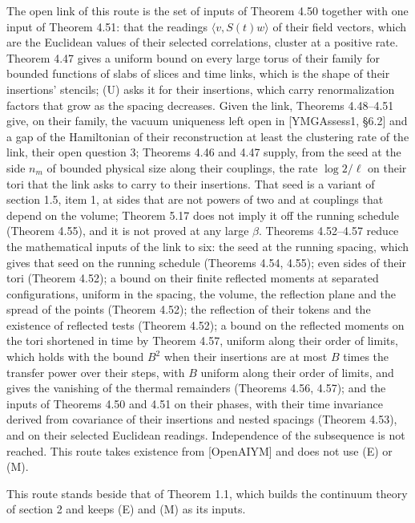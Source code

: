 \documentclass[10pt,letterpaper,twocolumn]{article}
\begin{document}
The open link of this route is the set of inputs of Theorem 4.50 together with one input of Theorem 4.51: that the readings \(\langle v,S(t)w\rangle\) of their field vectors, which are the Euclidean values of their selected correlations, cluster at a positive rate. Theorem 4.47 gives a uniform bound on every large torus of their family for bounded functions of slabs of slices and time links, which is the shape of their insertions' stencils; (U) asks it for their insertions, which carry renormalization factors that grow as the spacing decreases. Given the link, Theorems 4.48--4.51 give, on their family, the vacuum uniqueness left open in {[}YMGAssess1, §6.2{]} and a gap of the Hamiltonian of their reconstruction at least the clustering rate of the link, their open question 3; Theorems 4.46 and 4.47 supply, from the seed at the side \(n_m\) of bounded physical size along their couplings, the rate \(\log2/\ell\) on their tori that the link asks to carry to their insertions. That seed is a variant of section 1.5, item 1, at sides that are not powers of two and at couplings that depend on the volume; Theorem 5.17 does not imply it off the running schedule (Theorem 4.55), and it is not proved at any large \(\beta\). Theorems 4.52--4.57 reduce the mathematical inputs of the link to six: the seed at the running spacing, which gives that seed on the running schedule (Theorems 4.54, 4.55); even sides of their tori (Theorem 4.52); a bound on their finite reflected moments at separated configurations, uniform in the spacing, the volume, the reflection plane and the spread of the points (Theorem 4.52); the reflection of their tokens and the existence of reflected tests (Theorem 4.52); a bound on the reflected moments on the tori shortened in time by Theorem 4.57, uniform along their order of limits, which holds with the bound \(B^2\) when their insertions are at most \(B\) times the transfer power over their steps, with \(B\) uniform along their order of limits, and gives the vanishing of the thermal remainders (Theorems 4.56, 4.57); and the inputs of Theorems 4.50 and 4.51 on their phases, with their time invariance derived from covariance of their insertions and nested spacings (Theorem 4.53), and on their selected Euclidean readings. Independence of the subsequence is not reached. This route takes existence from {[}OpenAIYM{]} and does not use (E) or (M).

This route stands beside that of Theorem 1.1, which builds the continuum theory of section 2 and keeps (E) and (M) as its inputs.
\end{document}
